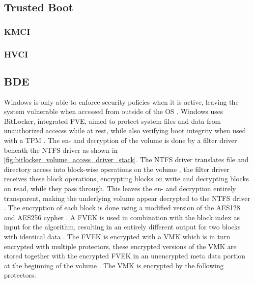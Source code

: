 \subsection{Trusted Boot}
\subsubsection{KMCI}
\subsubsection{HVCI}

\subsection{\acf{BDE}}
\label{sec:bde}
Windows is only able to enforce security policies when it is active, leaving the system vulnerable when accessed from outside of the \ac{OS} \cite[9. BitLocker Drive encryption]{windows-internals-6-part2}. Windows uses BitLocker, integrated \ac{FVE}, aimed to protect system files and data from unauthorized accecss while at rest\cite{microsoft-bitlocker-overview}, while also verifying boot integrity when used with a \ac{TPM} \cite[9. BitLocker Drive encryption]{windows-internals-6-part2}. The en- and decryption of the volume is done by a filter driver beneath the \ac{NTFS} driver as shown in \autoref{fig:bitlocker_volume_access_driver_stack}. The \ac{NTFS} driver translates file and directory access into block-wise operations on the volume , the filter driver receives these block operations, encrypting blocks on write and decrypting blocks on read, while they pass through. This leaves the en- and decryption entirely transparent, making the underlying volume appear decrypted to the \ac{NTFS} driver \cite[9. Full-Volume Encryption Driver]{windows-internals-6-part2}. The encryption of each block is done using a modified version of the \ac{AES}128 and \ac{AES}256 cypher \cite[9. Encryption Keys]{windows-internals-6-part2}. A \ac{FVEK} is used in combination with the block index as input for the algorithm, resulting in an entirely different output for two blocks with identical data \cite[9. Full-Volume Encryption Driver]{windows-internals-6-part2}. The \ac{FVEK} is encrypted with a \ac{VMK} which is in turn encrypted with multiple protectors, these encrypted versions of the \ac{VMK} are stored together with the encrypted \ac{FVEK} in an unencrypted meta data portion at the beginning of the volume \cite[9. Encryption Keys]{windows-internals-6-part2}. The \ac{VMK} is encrypted by the following protectors:

